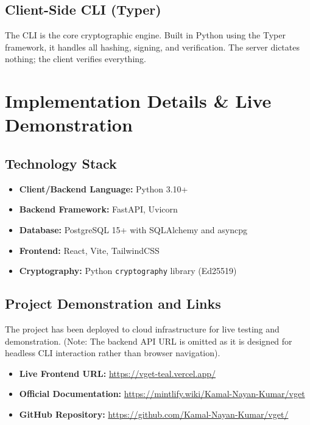 \documentclass[conference]{IEEEtran}
\begin{document}
\subsection{Client-Side CLI (Typer)}
The CLI is the core cryptographic engine. Built in Python using the Typer framework, it handles all hashing, signing, and verification. The server dictates nothing; the client verifies everything.

\section{Implementation Details \& Live Demonstration}

\subsection{Technology Stack}
\begin{itemize}
    \item \textbf{Client/Backend Language:} Python 3.10+
    \item \textbf{Backend Framework:} FastAPI, Uvicorn
    \item \textbf{Database:} PostgreSQL 15+ with SQLAlchemy and asyncpg
    \item \textbf{Frontend:} React, Vite, TailwindCSS
    \item \textbf{Cryptography:} Python \texttt{cryptography} library (Ed25519)
\end{itemize}

\subsection{Project Demonstration and Links}
The project has been deployed to cloud infrastructure for live testing and demonstration. (Note: The backend API URL is omitted as it is designed for headless CLI interaction rather than browser navigation).
\begin{itemize}
    \item \textbf{Live Frontend URL:} \url{https://vget-teal.vercel.app/}
    \item \textbf{Official Documentation:} \url{https://mintlify.wiki/Kamal-Nayan-Kumar/vget}
    \item \textbf{GitHub Repository:} \url{https://github.com/Kamal-Nayan-Kumar/vget/}
\end{itemize}
\end{document}
